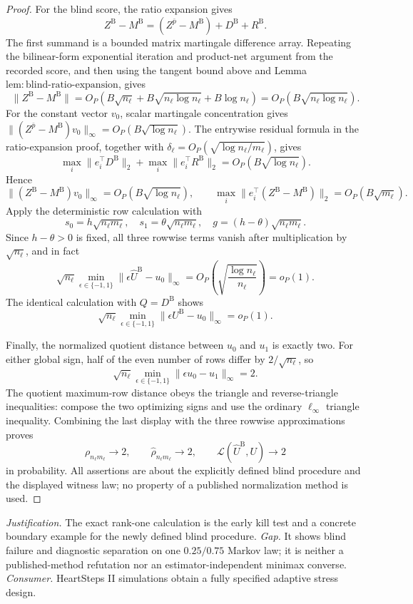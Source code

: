 \documentclass{article}
\begin{document}
\begin{proof}
For the blind score, the ratio expansion gives
\[
 Z^{\mathrm B}-M^{\mathrm B}
 =(Z^{\bar p}-M^{\mathrm B})+D^{\mathrm B}+R^{\mathrm B}.
\]
The first summand is a bounded matrix martingale difference array.  Repeating the bilinear-form exponential iteration and product-net argument from the recorded score, and then using the tangent bound above and Lemma \(\mathrm{lem:blind\mbox{-}ratio\mbox{-}expansion}\), gives
\[
 \lVert Z^{\mathrm B}-M^{\mathrm B}\rVert
 =O_P(B\sqrt{n_\ell}+B\sqrt{n_\ell\log n_\ell}+B\log n_\ell)
 =O_P(B\sqrt{n_\ell\log n_\ell}).
\]
For the constant vector \(v_0\), scalar martingale concentration gives
\(\lVert(Z^{\bar p}-M^{\mathrm B})v_0\rVert_\infty
=O_P(B\sqrt{\log n_\ell})\).  The entrywise residual formula in the ratio-expansion proof, together with \(\delta_\ell=O_P(\sqrt{\log n_\ell/m_\ell})\), gives
\[
 \max_i\lVert e_i^\top D^{\mathrm B}\rVert_2
 +\max_i\lVert e_i^\top R^{\mathrm B}\rVert_2
 =O_P(B\sqrt{\log n_\ell}).
\]
Hence
\[
 \lVert(Z^{\mathrm B}-M^{\mathrm B})v_0\rVert_\infty
 =O_P(B\sqrt{\log n_\ell}),
 \qquad
 \max_i\lVert e_i^\top(Z^{\mathrm B}-M^{\mathrm B})\rVert_2
 =O_P(B\sqrt{m_\ell}).
\]
Apply the deterministic row calculation with
\[
 s_0=h\sqrt{n_\ell m_\ell},\quad
 s_1=\theta\sqrt{n_\ell m_\ell},\quad
 g=(h-\theta)\sqrt{n_\ell m_\ell}.
\]
Since \(h-\theta>0\) is fixed, all three rowwise terms vanish after multiplication by \(\sqrt{n_\ell}\), and in fact
\[
 \sqrt{n_\ell}\min_{\epsilon\in\{-1,1\}}
 \lVert\epsilon\widehat U^{\mathrm B}-u_0\rVert_\infty
 =O_P\!\left(\sqrt{\frac{\log n_\ell}{n_\ell}}\right)=o_P(1).
\]
The identical calculation with \(Q=D^{\mathrm B}\) shows
\[
 \sqrt{n_\ell}\min_{\epsilon\in\{-1,1\}}
 \lVert\epsilon U^{\mathrm B}-u_0\rVert_\infty=o_P(1).
\]

Finally, the normalized quotient distance between \(u_0\) and \(u_1\) is exactly two.  For either global sign, half of the even number of rows differ by \(2/\sqrt{n_\ell}\), so
\[
 \sqrt{n_\ell}\min_{\epsilon\in\{-1,1\}}
 \lVert\epsilon u_0-u_1\rVert_\infty=2.
\]
The quotient maximum-row distance obeys the triangle and reverse-triangle inequalities: compose the two optimizing signs and use the ordinary \(\ell_\infty\) triangle inequality.  Combining the last display with the three rowwise approximations proves
\[
 \rho_{n_\ell m_\ell}\longrightarrow2,
 \qquad
 \widehat\rho_{n_\ell m_\ell}\longrightarrow2,
 \qquad
 \mathcal L(\widehat U^{\mathrm B},U)\longrightarrow2
\]
in probability.  All assertions are about the explicitly defined blind procedure and the displayed witness law; no property of a published normalization method is used.
\end{proof}
\par\smallskip\noindent \textit{Justification.} The exact rank-one calculation is the early kill test and a concrete boundary example for the newly defined blind procedure. \textit{Gap.} It shows blind failure and diagnostic separation on one \(0.25/0.75\) Markov law; it is neither a published-method refutation nor an estimator-independent minimax converse. \textit{Consumer.} HeartSteps II simulations obtain a fully specified adaptive stress design.
\end{document}
